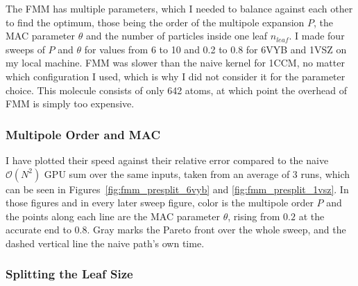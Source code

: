 The FMM has multiple parameters, which I needed to balance against each other to find the optimum, those being the order of the multipole expansion $P$, the MAC parameter $\theta$ and the number of particles inside one leaf $n_{leaf}$.
I made four sweeps of $P$ and $\theta$ for values from 6 to 10 and 0.2 to 0.8 for 6VYB and 1VSZ on my local machine.
FMM was slower than the naive kernel for 1CCM, no matter which configuration I used, which is why I did not consider it for the parameter choice.
This molecule consists of only 642 atoms, at which point the overhead of FMM is simply too expensive.

\subsubsection{Multipole Order and MAC}

I have plotted their speed against their relative error compared to the naive $\mathcal{O}(N^2)$ GPU sum over the same inputs, taken from an average of 3 runs, which can be seen in Figures~\ref{fig:fmm_presplit_6vyb} and \ref{fig:fmm_presplit_1vsz}.
In those figures and in every later sweep figure, color is the multipole order $P$ and the points along each line are the MAC parameter $\theta$, rising from $0.2$ at the accurate end to $0.8$.
Gray marks the Pareto front over the whole sweep, and the dashed vertical line the naive path's own time.

%




\subsubsection{Splitting the Leaf Size}

